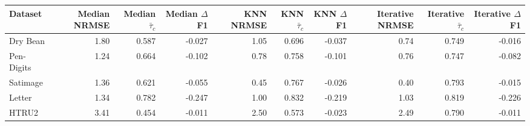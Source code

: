 \begin{tabular}{lrrrrrrrrr}
\toprule
Dataset & Median NRMSE & Median $\bar\tau_c$ & Median $\Delta$F1 & KNN NRMSE & KNN $\bar\tau_c$ & KNN $\Delta$F1 & Iterative NRMSE & Iterative $\bar\tau_c$ & Iterative $\Delta$F1 \\
\midrule
Dry Bean & 1.80 & 0.587 & -0.027 & 1.05 & 0.696 & -0.037 & 0.74 & 0.749 & -0.016 \\
\midrule
Pen-Digits & 1.24 & 0.664 & -0.102 & 0.78 & 0.758 & -0.101 & 0.76 & 0.747 & -0.082 \\
\midrule
Satimage & 1.36 & 0.621 & -0.055 & 0.45 & 0.767 & -0.026 & 0.40 & 0.793 & -0.015 \\
\midrule
Letter & 1.34 & 0.782 & -0.247 & 1.00 & 0.832 & -0.219 & 1.03 & 0.819 & -0.226 \\
\midrule
HTRU2 & 3.41 & 0.454 & -0.011 & 2.50 & 0.573 & -0.023 & 2.49 & 0.790 & -0.011 \\
\bottomrule
\end{tabular}